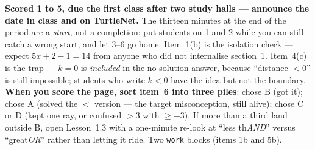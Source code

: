 \documentclass[10pt]{article}
\begin{document}
\begin{teachernote}[Homework]
\textbf{Scored 1 to 5, due the first class after two study halls --- announce the date in class and on TurtleNet.} The thirteen minutes at the end of the period are a \emph{start},
not a completion: put students on 1 and 2 while you can still catch a wrong start, and let 3--6
go home. Item~1(b) is the isolation check --- expect $5x+2-1=14$ from anyone who did not
internalise section~1. Item~4(c) is the trap
--- $k=0$ is \emph{included} in the no-solution answer, because ``distance $<0$'' is still
impossible; students who write $k<0$ have the idea but not the boundary. \textbf{When you score
the page, sort item~6 into three piles}: chose B (got it); chose A (solved the $<$ version --- the
target misconception, still alive); chose C or D (kept one ray, or confused $>3$ with $\ge-3$).
If more than a third land outside B, open Lesson~1.3 with a one-minute re-look at ``less
th\emph{AND}'' versus ``great\emph{OR}'' rather than letting it ride. Two \texttt{work} blocks
(items 1b and 5b).
\end{teachernote}
\end{document}
